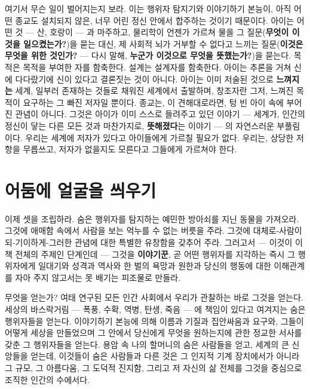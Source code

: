여기서 무슨 일이 벌어지는지 보라. 이는 행위자 탐지기와 이야기하기 본능이, 아직 어떤 종교도 설치되지 않은, 너무 어린 정신 안에서 합주하는 것이기 때문이다. 아이는 어떤 것 — 산, 호랑이 — 과 마주하고, 물리학이 언젠가 가르쳐 물을 그 질문(\textbf{무엇이 이것을 일으켰는가?})을 묻는 대신, 제 사회적 뇌가 거부할 수 없다고 느끼는 질문(\textbf{이것은 무엇을 위한 것인가?} — 다시 말해, \textbf{누군가 이것으로 무엇을 뜻했는가?})을 묻는다. 목적은 목적을 부여한 자를 함축한다. 설계는 설계자를 함축한다. 아이는 추론을 거쳐 신에 다다랐기에 신이 있다고 결론짓는 것이 아니다. 아이는 이미 저술된 것으로 \textbf{느껴지는} 세계, 일부러 존재하는 것들로 채워진 세계에서 출발하며, 창조자란 그저, 느껴진 목적이 요구하는 그 빠진 저자일 뿐이다. 종교는, 이 견해대로라면, 텅 빈 아이 속에 부어진 관념이 아니다. 그것은 아이가 이미 스스로 들려주고 있던 이야기 — 세계가, 인간의 정신이 닿는 다른 모든 것과 마찬가지로, \textbf{뜻해졌다}는 이야기 — 의 자연스러운 부풀림이다. 우리는 세계에 저자가 있다고 아이들에게 가르칠 필요가 없다. 우리는, 상당한 저항을 무릅쓰고, 저자가 없을지도 모른다고 그들에게 가르쳐야 한다.

\section*{어둠에 얼굴을 씌우기}

이제 셋을 조립하라. 숨은 행위자를 탐지하는 예민한 방아쇠를 지닌 동물을 가져오라. 그것에 애매함 속에서 사람을 보는 억누를 수 없는 버릇을 주라. 그것에 대체로-사람이되-기이하게-그러한 관념에 대한 특별한 유창함을 갖추어 주라. 그러고서 — 이것이 이 책 전체의 주제인 단계인데 — 그것을 \textbf{이야기꾼}, 곧 어떤 행위자를 지각하는 즉시 그 행위자에게 일대기와 성격과 역사와 한 벌의 욕망과 원한과 당신의 행동에 대한 이해관계를 자아 주지 않고서는 못 배기는 피조물로 만들라.

무엇을 얻는가? 여태 연구된 모든 인간 사회에서 우리가 관찰하는 바로 그것을 얻는다. 세상의 바스락거림 — 폭풍, 수확, 역병, 탄생, 죽음 — 에 책임이 있다고 여겨지는 숨은 행위자들을 얻는다. 이야기하기 본능에 의해 이름과 기질과 집안싸움과 요구와, 그들이 어떻게 세상을 만들었으며 그 안에서 당신에게 무엇을 원하는지에 관한 정교한 서사를 갖춘 그 행위자들을 얻는다. 용암 속 나의 할머니의 숨은 사람들을 얻고, 세계의 큰 신앙들을 얻는데, 이것들이 숨은 사람들과 다른 것은 그 인지적 기계 장치에서가 아니라 그 규모, 그 아름다움, 그 도덕적 진지함, 그리고 저 자신의 삶 전체를 그것을 중심으로 조직한 인간의 수에서다.

